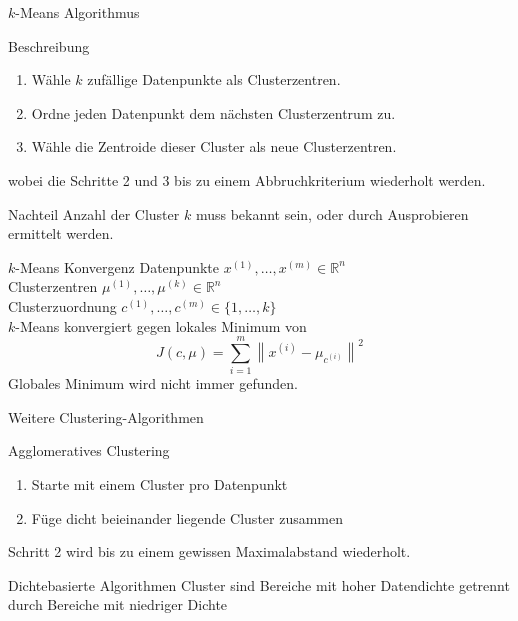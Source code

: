 \documentclass[xcolor={dvipsnames,svgnames}]{beamer}
\newcommand{\norm}[1]{\left\lVert#1\right\rVert}
\begin{document}
\begin{frame}{$k$-Means Algorithmus}

  \begin{block}{Beschreibung}
    \begin{enumerate}
    \item Wähle $k$ zufällige Datenpunkte als Clusterzentren.
    \item Ordne jeden Datenpunkt dem nächsten Clusterzentrum zu.
    \item Wähle die Zentroide dieser Cluster als neue Clusterzentren.
    \end{enumerate}
    wobei die Schritte 2 und 3 bis zu einem Abbruchkriterium wiederholt werden.
  \end{block}

  \begin{alertblock}{Nachteil}
    Anzahl der Cluster $k$ muss bekannt sein, oder durch Ausprobieren ermittelt werden.
  \end{alertblock}
\end{frame}

\begin{frame}{$k$-Means Konvergenz}
  Datenpunkte $x^{(1)}, \ldots, x^{(m)} \in \mathbb{R}^n$ \\ 
  Clusterzentren $\mu^{(1)},\ldots,\mu^{(k)} \in \mathbb{R}^n$ \\
  Clusterzuordnung $c^{(1)},\ldots,c^{(m)} \in \{1,\ldots,k\}$ \\
  \vspace{1em}
  $k$-Means konvergiert gegen lokales Minimum von
  \[
    J(c,\mu) = \sum_{i=1}^{m}\norm{x^{(i)} - \mu_{c^{(i)}}}^2
  \]
  Globales Minimum wird nicht immer gefunden.
\end{frame}

\begin{frame}{Weitere Clustering-Algorithmen}

  \begin{block}{Agglomeratives Clustering}
    \begin{enumerate}
      \item Starte mit einem Cluster pro Datenpunkt
      \item Füge dicht beieinander liegende Cluster zusammen
    \end{enumerate}
    Schritt 2 wird bis zu einem gewissen Maximalabstand wiederholt.
  \end{block}

  \begin{block}{Dichtebasierte Algorithmen}
    Cluster sind Bereiche mit hoher Datendichte getrennt durch Bereiche mit
    niedriger Dichte
  \end{block}

\end{frame}
\end{document}
